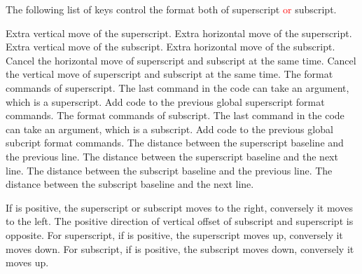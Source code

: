 \documentclass[load-preamble+]{cnltx-doc}
\renewcommand{\emph}[1]{\textcolor{red}{#1}}
\begin{document}
The following list of keys control the format both of superscript \emph{or} subscript.
\begin{options}
  \Default{0pt}
  Extra vertical move of the superscript. 
  \Default{0pt}
  Extra horizontal move of the superscript.
  \Default{0pt}
  Extra vertical move of the subscript.
  \Default{0pt}
  Extra horizontal move of the subscript.
  Cancel the horizontal move of superscript and subscript at the same time.
  Cancel the vertical move of superscript and subscript at the same time.
  The format commands of superscript. The last command in the code can take an argument, which is a superscript.
  Add code to the previous global superscript format commands.
  The format commands of subscript. The last command in the code can take an argument, which is a subscript.
  Add code to the previous global subcript format commands.
  The distance between the superscript baseline and the previous line.
  The distance between the superscript baseline and the next line.
  The distance between the subscript baseline and the previous line.
  The distance between the subscript baseline and the next line.
\end{options}

If  is positive, the superscript or subscript moves to the right, conversely it moves to the left. The positive direction of vertical offset of subscript and superscript is opposite. For superscript, if  is positive, the superscript moves up, conversely it moves down. For subscript, if  is positive, the subscript moves down, conversely it moves up.
\end{document}
